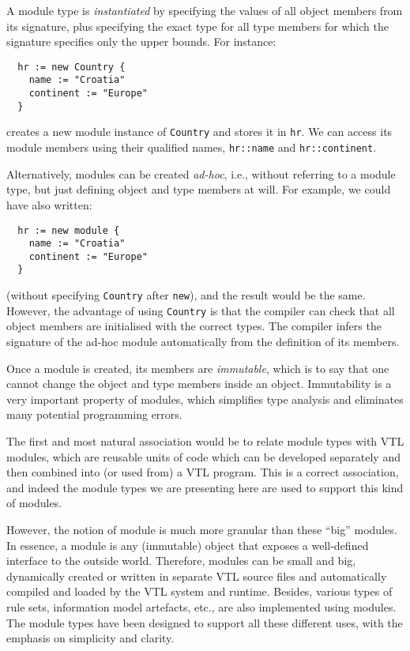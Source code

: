 \documentclass[droidmono,libertine,twoside,user,unofficial]{ecarticle}
\begin{document}
A module type is \emph{instantiated} by specifying the values of all
object members from its signature, plus specifying the exact type for
all type members for which the signature specifies only the upper
bounds. For instance:
\begin{lstlisting}
  hr := new Country {
    name := "Croatia"
    continent := "Europe"
  }
\end{lstlisting}
creates a new module instance of \texttt{Country} and stores it in
\texttt{hr}.  We can access its module members using their qualified
names, \texttt{hr::name} and \texttt{hr::continent}.

Alternatively, modules can be created \emph{ad-hoc}, i.e.,
without referring to a module type, but just defining object and type
members at will.  For example, we could have also written:
\begin{lstlisting}
  hr := new module {
    name := "Croatia"
    continent := "Europe"
  }
\end{lstlisting}
(without specifying \texttt{Country} after \texttt{new}), and the
result would be the same.  However, the advantage of using
\texttt{Country} is that the compiler can check that all object
members are initialised with the correct types.
%
The compiler infers the signature of the ad-hoc module automatically
from the definition of its members.

Once a module is created, its members are \emph{immutable}, which is
to say that one cannot change the object and type members inside an
object.  Immutability is a very important property of modules, which
simplifies type analysis and eliminates many potential programming
errors.

The first and most natural association would be to relate module types
with VTL modules, which are reusable units of code which can be
developed separately and then combined into (or used from) a VTL
program.  This is a correct association, and indeed the module types
we are presenting here are used to support this kind of modules.

However, the notion of module is much more granular than these ``big''
modules.  In essence, a module is any (immutable) object that exposes
a well-defined interface to the outside world.  Therefore, modules can
be small and big, dynamically created or written in separate VTL
source files and automatically compiled and loaded by the VTL system
and runtime.  Besides, various types of rule sets, information model
artefacts, etc., are also implemented using modules.
%
The module types have been designed to support all these different
uses, with the emphasis on simplicity and clarity.
\end{document}
